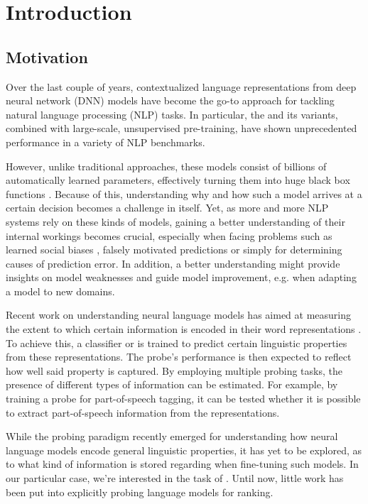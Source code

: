 \chapter{Introduction}
\section{Motivation}
Over the last couple of years, contextualized language representations from deep neural network (DNN) models have become the go-to approach for tackling natural language processing (NLP) tasks. In particular, the  \citep{vaswani2017attention} and its variants, combined with large-scale, unsupervised pre-training, have shown unprecedented performance in a variety of NLP benchmarks.

However, unlike traditional approaches, these models consist of billions of automatically learned parameters, effectively turning them into huge black box functions \citep{Samek2021ExplainingDN}. Because of this, understanding why and how such a model arrives at a certain decision becomes a challenge in itself. Yet, as more and more NLP systems rely on these kinds of models, gaining a better understanding of their internal workings becomes crucial, especially when facing problems such as learned social biases \citep{Nadeem2021StereoSetMS,Bender2021OnTD, kurita2019measuring}, falsely motivated predictions \citep{10.1145/2939672.2939778, DBLP:journals/corr/abs-1802-00614} or simply for determining causes of prediction error. In addition, a better understanding might provide insights on model weaknesses and guide model improvement, e.g. when adapting a model to new domains.

Recent work on understanding neural language models has aimed at measuring the extent to which certain information is encoded in their word representations \citep{tenney-etal-2019-bert,Tenney2019WhatDY,DBLP:journals/corr/abs-1909-03368}. To achieve this, a  classifier or  is trained to predict certain linguistic properties from these representations. The probe's performance is then expected to reflect how well said property is captured. By employing multiple probing tasks, the presence of different types of information can be estimated. For example, by training a probe for part-of-speech tagging, it can be tested whether it is possible to extract part-of-speech information from the representations.

While the probing paradigm recently emerged for understanding how neural language models encode general linguistic properties, it has yet to be explored, as to what kind of information is stored regarding  when fine-tuning such models. In our particular case, we're interested in the task of . Until now, little work has been put into explicitly probing language models for ranking.


